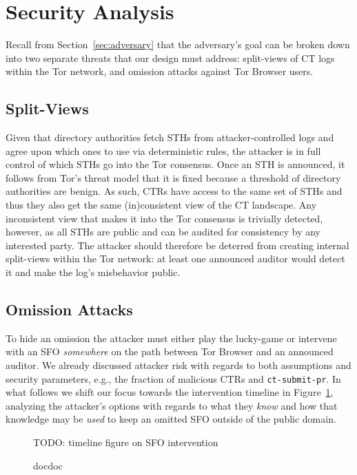 \section{Security Analysis} \label{sec:security}
Recall from Section~\ref{sec:adversary} that the adversary's goal can be
broken down into two separate threats that our design must address:
	split-views of CT logs within the Tor network, and
	omission attacks against Tor Browser users.

\subsection{Split-Views}
Given that directory authorities fetch STHs from attacker-controlled logs and
agree upon which ones to use via deterministic rules, the attacker is in full
control of which STHs go into the Tor consensus.  Once an STH is
announced, it follows from Tor's threat model that it is fixed because a
threshold of directory authorities are benign.  As such, CTRs have access to
the same set of STHs and thus they also get the same (in)consistent view of the
CT landscape.  Any inconsistent view that makes it into the Tor consensus is
trivially detected, however, as all STHs are public and can be audited for
consistency by any interested party.  The attacker should therefore be
deterred from creating internal split-views within the Tor network:
	at least one announced auditor would detect it and make the log's
	misbehavior public.

\subsection{Omission Attacks}
To hide an omission the attacker must either play the lucky-game or intervene
with an SFO \emph{somewhere} on the path between Tor Browser and an announced
auditor.  We already discussed attacker risk with regards to both assumptions
and security parameters, e.g., the fraction of malicious CTRs and
\texttt{ct-submit-pr}.  In what follows we shift our focus towards the
intervention timeline in Figure~\ref{fig:sfo-intervention}, analyzing the
attacker's options with regards to what they \emph{know} and how that knowledge
may be \emph{used} to keep an omitted SFO outside of the public domain.

\begin{figure}
	\centering
	TODO: timeline figure on SFO intervention
	\caption{%
		docdoc
	}
	\label{fig:sfo-intervention}
\end{figure}

